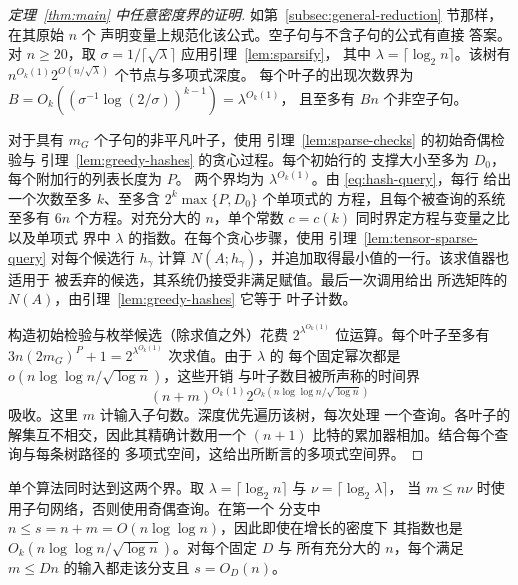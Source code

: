 \begin{proof}[定理~\ref{thm:main} 中任意密度界的证明]
如第~\ref{subsec:general-reduction} 节那样，在其原始 $n$ 个
声明变量上规范化该公式。空子句与不含子句的公式有直接
答案。对 $n\ge20$，取
$\sigma=1/\lceil\sqrt{\lambda}\rceil$ 应用引理~\ref{lem:sparsify}，
其中 $\lambda=\lceil\log_2 n\rceil$。该树有
$n^{O_k(1)}2^{O(n/\sqrt{\lambda})}$ 个节点与多项式深度。
每个叶子的出现次数界为
$B=O_k((\sigma^{-1}\log(2/\sigma))^{k-1})=\lambda^{O_k(1)}$，
且至多有 $Bn$ 个非空子句。

对于具有 $m_G$ 个子句的非平凡叶子，使用
引理~\ref{lem:sparse-checks} 的初始奇偶检验与
引理~\ref{lem:greedy-hashes} 的贪心过程。每个初始行的
支撑大小至多为 $D_0$，每个附加行的列表长度为 $P$。
两个界均为 $\lambda^{O_k(1)}$。由 \eqref{eq:hash-query}，每行
给出一个次数至多 $k$、至多含 $2^k\max\{P,D_0\}$ 个单项式的
方程，且每个被查询的系统至多有 $6n$ 个方程。对充分大的
$n$，单个常数 $c=c(k)$ 同时界定方程与变量之比以及单项式
界中 $\lambda$ 的指数。在每个贪心步骤，使用
引理~\ref{lem:tensor-sparse-query} 对每个候选行 $h_\gamma$ 计算
$N(A;h_\gamma)$，并追加取得最小值的一行。该求值器也适用于
被丢弃的候选，其系统仍接受非满足赋值。最后一次调用给出
所选矩阵的 $N(A)$，由引理~\ref{lem:greedy-hashes} 它等于
叶子计数。

构造初始检验与枚举候选（除求值之外）花费
$2^{\lambda^{O_k(1)}}$ 位运算。每个叶子至多有
$3n(2m_G)^P+1=2^{\lambda^{O_k(1)}}$ 次求值。由于 $\lambda$ 的
每个固定幂次都是 $o(n\log\log n/\sqrt{\log n})$，这些开销
与叶子数目被所声称的时间界
\[
 (n+m)^{O_k(1)}2^{O_k(n\log\log n/\sqrt{\log n})}
\]
吸收。这里 $m$ 计输入子句数。深度优先遍历该树，每次处理
一个查询。各叶子的解集互不相交，因此其精确计数用一个
$(n+1)$ 比特的累加器相加。结合每个查询与每条树路径的
多项式空间，这给出所断言的多项式空间界。
\end{proof}

单个算法同时达到这两个界。取
$\lambda=\lceil\log_2 n\rceil$ 与 $\nu=\lceil\log_2\lambda\rceil$，
当 $m\le n\nu$ 时使用子句网络，否则使用奇偶查询。在第一个
分支中 $n\le s=n+m=O(n\log\log n)$，因此即使在增长的密度下
其指数也是 $O_k(n\log\log n/\sqrt{\log n})$。对每个固定 $D$ 与
所有充分大的 $n$，每个满足 $m\le Dn$ 的输入都走该分支且
$s=O_D(n)$。
